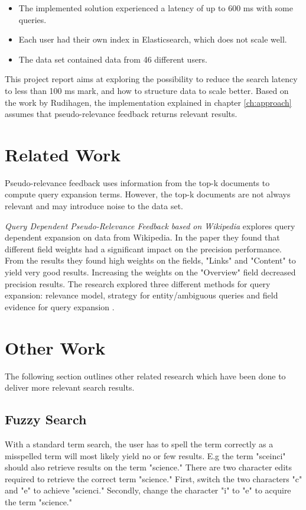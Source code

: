 \begin{itemize}
  \item The implemented solution experienced a latency of up to 600 ms with some queries.
  \item Each user had their own index in Elasticsearch, which does not scale well.
  \item The data set contained data from 46 different users.
\end{itemize}

This project report aims at exploring the possibility to reduce the search latency to less than 100 ms mark, and how to structure data to scale better.
Based on the work by Rudihagen,
the implementation explained in chapter \ref{ch:approach} assumes that pseudo-relevance feedback returns relevant results.

\section{Related Work}
Pseudo-relevance feedback uses information from the top-k documents to compute query expansion terms.
However, the top-k documents are not always relevant and may introduce noise to the data set.

\textit{Query Dependent Pseudo-Relevance Feedback based on Wikipedia} explores query dependent expansion on data from Wikipedia.
In the paper they found that different field weights had a significant impact on the precision performance.
From the results they found high weights on the fields, "Links" and "Content" to yield very good results.
Increasing the weights on the "Overview" field decreased precision results.
The research explored three different methods for query expansion:
relevance model, strategy for entity/ambiguous queries and field evidence for query expansion \cite{pseudo-relevance-wikipedia}.

\section{Other Work}
The following section outlines other related research which have been done to deliver more relevant search results.

\subsection{Fuzzy Search}
With a standard term search, the user has to spell the term correctly as a misspelled term will most likely yield no or few results.
E.g the term "sceinci" should also retrieve results on the term "science."
There are two character edits required to retrieve the correct term "science."
First, switch the two characters "c" and "e" to achieve "scienci."
Secondly, change the character "i" to "e" to acquire the term "science."

